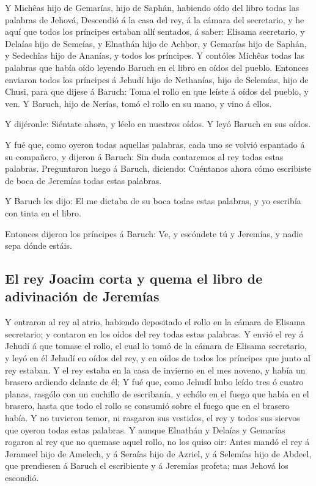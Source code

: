  Y Michêas hijo de Gemarías, hijo de Saphán, habiendo
oído del libro todas las palabras de Jehová,  Descendió á
la casa del rey, á la cámara del secretario, y he aquí que todos los
príncipes estaban allí sentados, á saber: Elisama secretario, y Delaías
hijo de Semeías, y Elnathán hijo de Achbor, y Gemarías hijo de Saphán, y
Sedechîas hijo de Ananías, y todos los príncipes.  Y
contóles Michêas todas las palabras que había oído leyendo Baruch en el
libro en oídos del pueblo.  Entonces enviaron todos los
príncipes á Jehudí hijo de Nethanías, hijo de Selemías, hijo de Chusi,
para que dijese á Baruch: Toma el rollo en que leíste á oídos del
pueblo, y ven. Y Baruch, hijo de Nerías, tomó el rollo en su mano, y
vino á ellos.

 Y dijéronle: Siéntate ahora, y léelo en nuestros oídos.
Y leyó Baruch en sus oídos.

 Y fué que, como oyeron todas aquellas palabras, cada uno
se volvió espantado á su compañero, y dijeron á Baruch: Sin duda
contaremos al rey todas estas palabras.  Preguntaron
luego á Baruch, diciendo: Cuéntanos ahora cómo escribiste de boca de
Jeremías todas estas palabras.

 Y Baruch les dijo: El me dictaba de su boca todas estas
palabras, y yo escribía con tinta en el libro.

 Entonces dijeron los príncipes á Baruch: Ve, y escóndete
tú y Jeremías, y nadie sepa dónde estáis.

\hypertarget{el-rey-joacim-corta-y-quema-el-libro-de-adivinaciuxf3n-de-jeremuxedas}{%
\subsection{El rey Joacim corta y quema el libro de adivinación de
Jeremías}\label{el-rey-joacim-corta-y-quema-el-libro-de-adivinaciuxf3n-de-jeremuxedas}}

 Y entraron al rey al atrio, habiendo depositado el rollo
en la cámara de Elisama secretario; y contaron en los oídos del rey
todas estas palabras.  Y envió el rey á Jehudí á que
tomase el rollo, el cual lo tomó de la cámara de Elisama secretario, y
leyó en él Jehudí en oídos del rey, y en oídos de todos los príncipes
que junto al rey estaban.  Y el rey estaba en la casa de
invierno en el mes noveno, y había un brasero ardiendo delante de él;
 Y fué que, como Jehudí hubo leído tres ó cuatro planas,
rasgólo con un cuchillo de escribanía, y echólo en el fuego que había en
el brasero, hasta que todo el rollo se consumió sobre el fuego que en el
brasero había.  Y no tuvieron temor, ni rasgaron sus
vestidos, el rey y todos sus siervos que oyeron todas estas palabras.
 Y aunque Elnathán y Delaías y Gemarías rogaron al rey
que no quemase aquel rollo, no los quiso oir:  Antes
mandó el rey á Jerameel hijo de Amelech, y á Seraías hijo de Azriel, y á
Selemías hijo de Abdeel, que prendiesen á Baruch el escribiente y á
Jeremías profeta; mas Jehová los escondió.

